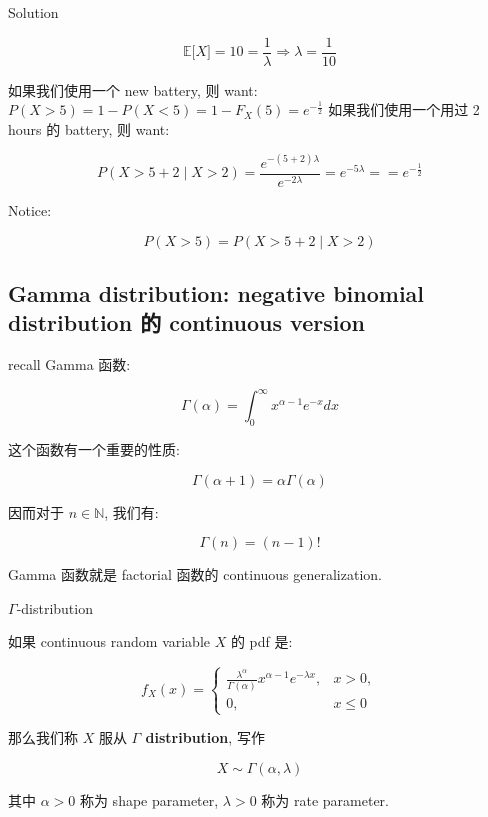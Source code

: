 \documentclass{qlnotes-export}
\begin{document}
\begin{qlsolution}{Solution}

\[{\mathbb{E}}\lbrack X\rbrack = 10 = \frac{1}{\lambda}\Longrightarrow\lambda = \frac{1}{10}\]

如果我们使用一个 new battery, 则 want: \(P(X > 5) = 1 - P(X < 5) = 1 - F_{X}(5) = e^{- \frac{1}{2}}\) 如果我们使用一个用过 2 hours 的 battery, 则 want:

\[P(X > 5 + 2 \mid X > 2) = \frac{e^{- (5 + 2)\lambda}}{e^{- 2\lambda}} = e^{- 5\lambda} = = e^{- \frac{1}{2}}\]

Notice:

\[P(X > 5) = P(X > 5 + 2 \mid X > 2)\]

\end{qlsolution}

\subsection{Gamma distribution: negative binomial distribution 的 continuous version}\label{gamma-distribution-negative-binomial-distribution-ux7684-continuous-version}

recall Gamma 函数:

\[\Gamma(\alpha) = \int_{0}^{\infty}x^{\alpha - 1}e^{- x} dx\]

这个函数有一个重要的性质:

\[\Gamma(\alpha + 1) = \alpha\Gamma(\alpha)\]

因而对于 \(n \in {\mathbb{N}}\), 我们有:

\[\Gamma(n) = (n - 1)!\]

Gamma 函数就是 factorial 函数的 continuous generalization.

\begin{definition}{\(\Gamma\)-distribution}\label{def-02-random-variables-gamma-distribution}

如果 continuous random variable \(X\) 的 pdf 是:

\[f_{X}(x) = \left\{ \begin{matrix}
{\frac{\lambda^{\alpha}}{\Gamma(\alpha)}x^{\alpha - 1}e^{- \lambda x},} & {x > 0,} \\
{0,} & {x \leq 0}
\end{matrix} \right.\]

那么我们称 \(X\) 服从 \textbf{\(\Gamma\) distribution}, 写作

\[X \sim \Gamma(\alpha,\lambda)\]

其中 \(\alpha > 0\) 称为 shape parameter, \(\lambda > 0\) 称为 rate parameter.

\end{definition}
\end{document}
